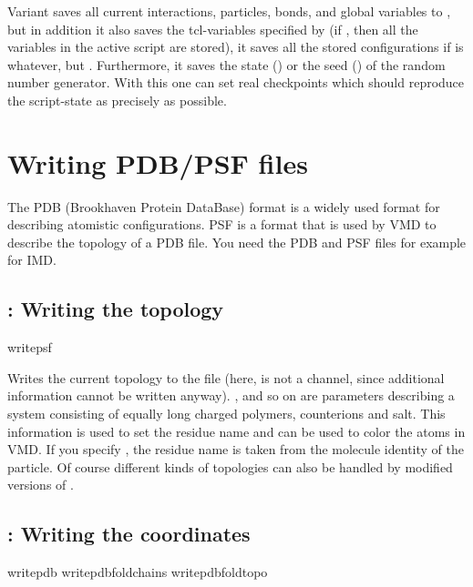 Variant  saves all current interactions, particles, bonds,
and global variables to , but in addition it also
saves the tcl-variables specified by  (if , then
all the variables in the active script are stored), it saves all the
stored configurations if  is whatever, but \lit{-}.
Furthermore, it saves the state () or the seed ()
of the random number generator.  With this one can set real
checkpoints which should reproduce the script-state as precisely as
possible.

\section{Writing PDB/PSF files}
The PDB (Brookhaven Protein DataBase) format is a widely used format
for describing atomistic configurations. PSF is a format that is used
by VMD to describe the topology of a PDB file. You need the PDB and
PSF files for example for IMD.

\subsection{: Writing the topology}

\begin{essyntax}
  writepsf     
   
\end{essyntax}
Writes the current topology to the file  (here, 
is not a channel, since additional information cannot be written
anyway).  ,  and so on are parameters describing a
system consisting of equally long charged polymers, counterions and
salt.  This information is used to set the residue name and can be
used to color the atoms in VMD. If you specify , the
residue name is taken from the molecule identity of the particle. Of
course different kinds of topologies can also be handled by modified
versions of .


\subsection{: Writing the coordinates}

\begin{essyntax}
   writepdb 
   writepdbfoldchains  
    
   writepdbfoldtopo  
\end{essyntax}

